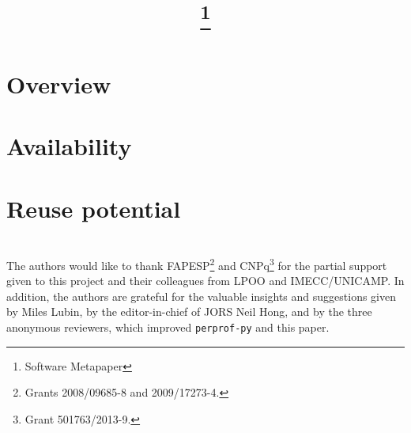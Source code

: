 \documentclass{article}
\begin{document}
\title{\mytitle\thanks{Software Metapaper}}
\author{\myauthor}
\date{\small \myaffiliation}
\maketitle
    \begin{abstract}
      
    \end{abstract}



\section{Overview}


\section{Availability}


\section{Reuse potential}

   

\section*{}
The authors would like to thank FAPESP\footnote{Grants 2008/09685-8 and 2009/17273-4.}
and CNPq\footnote{Grant 501763/2013-9.} for the
partial support given to this project
and their colleagues from LPOO and IMECC/UNICAMP.
In addition, the authors are grateful for the valuable insights and suggestions 
given by Miles Lubin, by the editor-in-chief of JORS Neil Hong, and by the three anonymous reviewers, which improved
{\tt perprof-py} and this paper.

\printbibliography
\end{document}
